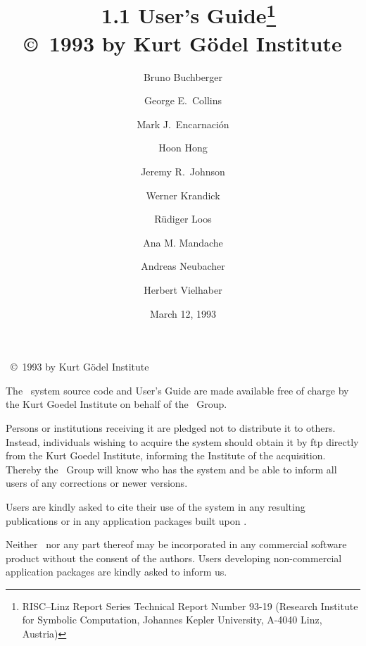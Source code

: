 
\makeindex




\title{
\saclib\ 1.1 User's Guide\thanks{
  RISC--Linz Report Series Technical Report Number 93-19
  (Research Institute for Symbolic Computation, Johannes Kepler University,
  A-4040 Linz, Austria)
}
\\\bigskip \small
\copyright\ 1993 by Kurt G\"{o}del Institute
}

\author{
Bruno Buchberger \and George E.\ Collins \and Mark J.\ Encarnaci\'{o}n \and
Hoon Hong \and Jeremy R.\ Johnson \and Werner Krandick \and R\"{u}diger Loos
\and Ana M. Mandache \and Andreas Neubacher \and Herbert Vielhaber
}

\date{March 12, 1993}
\maketitle


\clearpage \vfill
\begin{center}
  \saclib\ \copyright\ 1993 by Kurt G\"{o}del Institute
\end{center}

\bigskip

The \saclib\ system source code and User's Guide are made available free
of charge by the Kurt Goedel Institute on behalf of the \saclib\ Group.

Persons or institutions receiving it are pledged not to distribute it to
others.  Instead, individuals wishing to acquire the system should obtain it
by ftp directly from the Kurt Goedel Institute, informing the Institute of
the acquisition.  Thereby the \saclib\ Group will know who has the system and
be able to inform all users of any corrections or newer versions.

Users are kindly asked to cite their use of the system in any resulting
publications or in any application packages built upon \saclib.

Neither \saclib\ nor any part thereof may be incorporated in any commercial
software product without the consent of the authors.  Users developing
non-commercial application packages are kindly asked to inform us.

